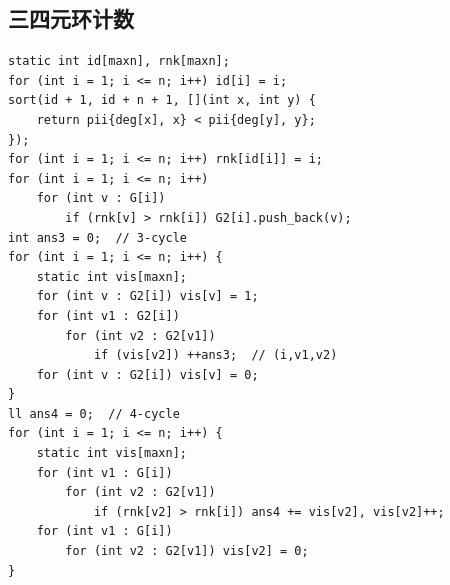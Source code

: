 \documentclass[twoside]{article}
\begin{document}
\subsection{三四元环计数}
\begin{lstlisting}
static int id[maxn], rnk[maxn];
for (int i = 1; i <= n; i++) id[i] = i;
sort(id + 1, id + n + 1, [](int x, int y) {
    return pii{deg[x], x} < pii{deg[y], y};
});
for (int i = 1; i <= n; i++) rnk[id[i]] = i;
for (int i = 1; i <= n; i++)
    for (int v : G[i])
        if (rnk[v] > rnk[i]) G2[i].push_back(v);
int ans3 = 0;  // 3-cycle
for (int i = 1; i <= n; i++) {
    static int vis[maxn];
    for (int v : G2[i]) vis[v] = 1;
    for (int v1 : G2[i])
        for (int v2 : G2[v1])
            if (vis[v2]) ++ans3;  // (i,v1,v2)
    for (int v : G2[i]) vis[v] = 0;
}
ll ans4 = 0;  // 4-cycle
for (int i = 1; i <= n; i++) {
    static int vis[maxn];
    for (int v1 : G[i])
        for (int v2 : G2[v1])
            if (rnk[v2] > rnk[i]) ans4 += vis[v2], vis[v2]++;
    for (int v1 : G[i])
        for (int v2 : G2[v1]) vis[v2] = 0;
}\end{lstlisting}
\end{document}
